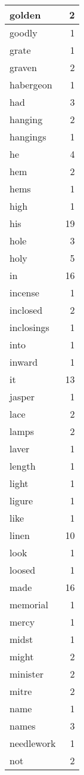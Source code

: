 \begin{center}
\begin{longtable}{l|r}
golden & 2 \\ \hline
goodly & 1 \\ \hline
grate & 1 \\ \hline
graven & 2 \\ \hline
habergeon & 1 \\ \hline
had & 3 \\ \hline
hanging & 2 \\ \hline
hangings & 1 \\ \hline
he & 4 \\ \hline
hem & 2 \\ \hline
hems & 1 \\ \hline
high & 1 \\ \hline
his & 19 \\ \hline
hole & 3 \\ \hline
holy & 5 \\ \hline
in & 16 \\ \hline
incense & 1 \\ \hline
inclosed & 2 \\ \hline
inclosings & 1 \\ \hline
into & 1 \\ \hline
inward & 1 \\ \hline
it & 13 \\ \hline
jasper & 1 \\ \hline
lace & 2 \\ \hline
lamps & 2 \\ \hline
laver & 1 \\ \hline
length & 1 \\ \hline
light & 1 \\ \hline
ligure & 1 \\ \hline
like & 1 \\ \hline
linen & 10 \\ \hline
look & 1 \\ \hline
loosed & 1 \\ \hline
made & 16 \\ \hline
memorial & 1 \\ \hline
mercy & 1 \\ \hline
midst & 1 \\ \hline
might & 2 \\ \hline
minister & 2 \\ \hline
mitre & 2 \\ \hline
name & 1 \\ \hline
names & 3 \\ \hline
needlework & 1 \\ \hline
not & 2 \\ \hline

\end{longtable}
\end{center}
